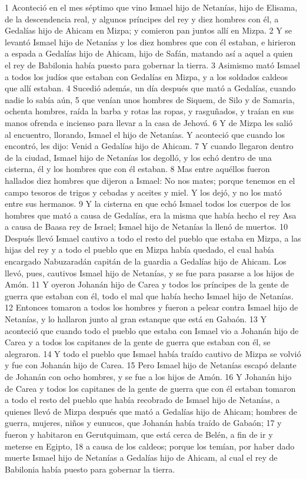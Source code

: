 1 Aconteció en el mes séptimo que vino Ismael hijo de Netanías, hijo de Elisama, de la descendencia real, y algunos príncipes del rey y diez hombres con él, a Gedalías hijo de Ahicam en Mizpa; y comieron pan juntos allí en Mizpa.
2 Y se levantó Ismael hijo de Netanías y los diez hombres que con él estaban, e hirieron a espada a Gedalías hijo de Ahicam, hijo de Safán, matando así a aquel a quien el rey de Babilonia había puesto para gobernar la tierra.
3 Asimismo mató Ismael a todos los judíos que estaban con Gedalías en Mizpa, y a los soldados caldeos que allí estaban. 
4 Sucedió además, un día después que mató a Gedalías, cuando nadie lo sabía aún,
5 que venían unos hombres de Siquem, de Silo y de Samaria, ochenta hombres, raída la barba y rotas las ropas, y rasguñados, y traían en sus manos ofrenda e incienso para llevar a la casa de Jehová.
6 Y de Mizpa les salió al encuentro, llorando, Ismael el hijo de Netanías. Y aconteció que cuando los encontró, les dijo: Venid a Gedalías hijo de Ahicam.
7 Y cuando llegaron dentro de la ciudad, Ismael hijo de Netanías los degolló, y los echó dentro de una cisterna, él y los hombres que con él estaban.
8 Mas entre aquéllos fueron hallados diez hombres que dijeron a Ismael: No nos mates; porque tenemos en el campo tesoros de trigos y cebadas y aceites y miel. Y los dejó, y no los mató entre sus hermanos.
9 Y la cisterna en que echó Ismael todos los cuerpos de los hombres que mató a causa de Gedalías, era la misma que había hecho el rey Asa a causa de Baasa rey de Israel; Ismael hijo de Netanías la llenó de muertos.
10 Después llevó Ismael cautivo a todo el resto del pueblo que estaba en Mizpa, a las hijas del rey y a todo el pueblo que en Mizpa había quedado, el cual había encargado Nabuzaradán capitán de la guardia a Gedalías hijo de Ahicam. Los llevó, pues, cautivos Ismael hijo de Netanías, y se fue para pasarse a los hijos de Amón.
11 Y oyeron Johanán hijo de Carea y todos los príncipes de la gente de guerra que estaban con él, todo el mal que había hecho Ismael hijo de Netanías.
12 Entonces tomaron a todos los hombres y fueron a pelear contra Ismael hijo de Netanías, y lo hallaron junto al gran estanque que está en Gabaón.
13 Y aconteció que cuando todo el pueblo que estaba con Ismael vio a Johanán hijo de Carea y a todos los capitanes de la gente de guerra que estaban con él, se alegraron.
14 Y todo el pueblo que Ismael había traído cautivo de Mizpa se volvió y fue con Johanán hijo de Carea.
15 Pero Ismael hijo de Netanías escapó delante de Johanán con ocho hombres, y se fue a los hijos de Amón.
16 Y Johanán hijo de Carea y todos los capitanes de la gente de guerra que con él estaban tomaron a todo el resto del pueblo que había recobrado de Ismael hijo de Netanías, a quienes llevó de Mizpa después que mató a Gedalías hijo de Ahicam; hombres de guerra, mujeres, niños y eunucos, que Johanán había traído de Gabaón;
17 y fueron y habitaron en Gerutquimam, que está cerca de Belén, a fin de ir y meterse en Egipto,
18 a causa de los caldeos; porque los temían, por haber dado muerte Ismael hijo de Netanías a Gedalías hijo de Ahicam, al cual el rey de Babilonia había puesto para gobernar la tierra.

